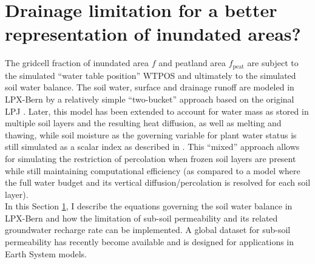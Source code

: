\section{Drainage limitation for a better representation of inundated areas? }
\label{app:soilwater}

The gridcell fraction of inundated area $f$ and peatland area $f_{\text{peat}}$ are subject to the simulated ``water table position'' WTPOS and ultimately to the simulated soil water balance. The soil water, surface and drainage runoff are modeled in LPX-Bern by a relatively simple ``two-bucket'' approach based on the original LPJ \citep{sitch03gcb}. Later, this model has been extended to account for water mass as stored in multiple soil layers and the resulting heat diffusion, as well as melting and thawing, while soil moisture as the governing variable for plant water status is still simulated as a scalar index as described in \citep{sitch03gcb}. This ``mixed'' approach allows for simulating the restriction of percolation when frozen soil layers are present while still maintaining computational efficiency (as compared to a model where the full water budget and its vertical diffusion/percolation is resolved for each soil layer).\\

In this Section \ref{app:soilwater}, I describe the equations governing the soil water balance in LPX-Bern and how the limitation of sub-soil permeability and its related groundwater recharge rate can be implemented. A global dataset for sub-soil permeability \citep{gleeson11grl} has recently become available and is designed for applications in Earth System models.

